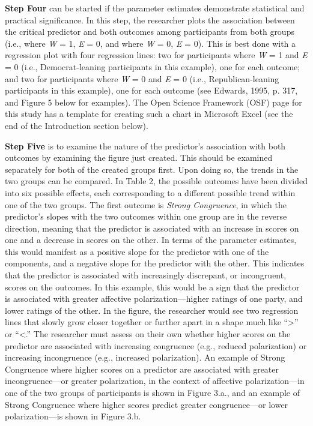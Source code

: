 \documentclass[authordate, meta, issue]{jote-new-article}
\begin{document}
	\textbf{Step Four }can be started if the parameter estimates demonstrate statistical and practical significance. In this step, the researcher plots the association between the critical predictor and both outcomes among participants from both groups (i.e., where \emph{W} = 1, \emph{E} = 0, and where \emph{W} = 0, \emph{E} = 0). This is best done with a regression plot with four regression lines: two for participants where \emph{W} = 1 and \emph{E} = 0 (i.e., Democrat-leaning participants in this example), one for each outcome; and two for participants where \emph{W} = 0 and \emph{E} = 0 (i.e., Republican-leaning participants in this example), one for each outcome (see Edwards, 1995, p. 317, and Figure 5 below for examples). The Open Science Framework (OSF) page for this study has a template for creating such a chart in Microsoft Excel (see the end of the Introduction section below).



	\textbf{Step Five }is to examine the nature of the predictor's association with both outcomes by examining the figure just created. This should be examined separately for both of the created groups first. Upon doing so, the trends in the two groups can be compared. In Table 2, the possible outcomes have been divided into six possible effects, each corresponding to a different possible trend within one of the two groups. The first outcome is \emph{Strong Congruence}, in which the predictor's slopes with the two outcomes within one group are in the reverse direction, meaning that the predictor is associated with an increase in scores on one and a decrease in scores on the other. In terms of the parameter estimates, this would manifest as a positive slope for the predictor with one of the components, and a negative slope for the predictor with the other. This indicates that the predictor is associated with increasingly discrepant, or incongruent, scores on the outcomes. In this example, this would be a sign that the predictor is associated with greater affective polarization—higher ratings of one party, and lower ratings of the other. In the figure, the researcher would see two regression lines that slowly grow closer together or further apart in a shape much like “>” or “<.” The researcher must assess on their own whether higher scores on the predictor are associated with increasing congruence (e.g., reduced polarization) or increasing incongruence (e.g., increased polarization). An example of Strong Congruence where higher scores on a predictor are associated with greater incongruence—or greater polarization, in the context of affective polarization—in one of the two groups of participants is shown in Figure 3.a., and an example of Strong Congruence where higher scores predict greater congruence—or lower polarization—is shown in Figure 3.b.
\end{document}
